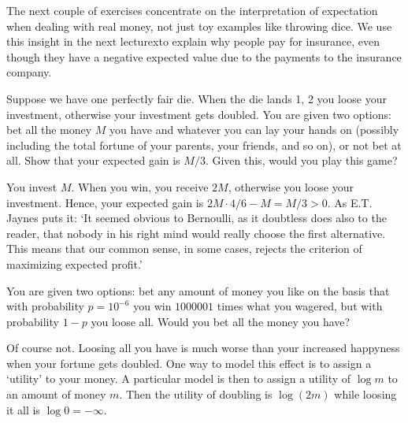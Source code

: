 The next couple of exercises concentrate on the interpretation of expectation when dealing with real money, not just toy examples like throwing dice.
We use this insight in the next lecturexto explain why people pay for insurance, even though they have a negative expected value due to the payments to the insurance company.

\begin{exercise}
Suppose we have one perfectly fair die.
When the die lands 1, 2 you loose your investment, otherwise your investment gets doubled.
 You are given two options: bet all the money $M$ you have and whatever you can lay your hands on (possibly including the total fortune of your parents, your friends, and so on), or not bet at all.
Show that your expected gain is $M/3$.
Given this, would you play this game?
\begin{solution}
You invest $M$. When you win, you receive  $2M$, otherwise you loose your investment. Hence, your expected gain is $2 M\cdot 4/6 - M = M/3 > 0$.
As E.T.
Jaynes puts it: `It seemed obvious to Bernoulli, as it doubtless does also to the reader, that nobody in his right mind would really choose the first alternative.
This means that our common sense, in some cases, rejects the criterion of maximizing expected profit.'
\end{solution}
\end{exercise}

\begin{exercise}
You are given two options: bet any amount of  money you like on the basis that with probability $p=10^{-6}$ you win  $1 000 001$ times what you wagered, but with probability $1-p$ you loose all.
Would you bet all the money you have?
\begin{solution}
  Of course not.
  Loosing all you have is much worse than your increased happyness when your fortune gets doubled.
  One way to model this effect is to assign a `utility' to your money.
  A particular model is then to assign a utility of $\log m$ to an amount of money $m$. Then the  utility of doubling is $\log(2m)$ while loosing it all is $\log 0 = -\infty$.
\end{solution}
\end{exercise}


